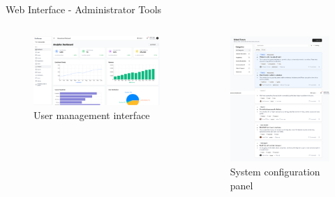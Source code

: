 \documentclass[aspectratio=169]{beamer}
\begin{document}
\begin{frame}{Web Interface - Administrator Tools}
    \begin{columns}
        \begin{figure}
            \includegraphics[width=\textwidth,height=0.55\textheight,keepaspectratio]{../pfe-pics/admin/Screenshot 2025-06-09 at 22-40-11 Vite React TS.png}
            \caption{User management interface}
        \end{figure}
        \begin{figure}
            \includegraphics[width=\textwidth,height=0.55\textheight,keepaspectratio]{../pfe-pics/admin/Screenshot 2025-06-09 at 22-41-16 Vite React TS.png}
            \caption{System configuration panel}
        \end{figure}
    \end{columns}
\end{frame}
\end{document}
